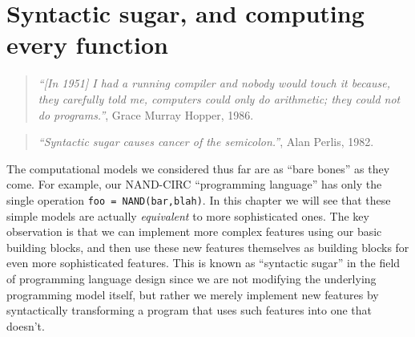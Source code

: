 \chapter{Syntactic sugar, and computing every
function}\label{finiteuniversalchap}


\begin{quote}
\emph{``{[}In 1951{]} I had a running compiler and nobody would touch it
because, they carefully told me, computers could only do arithmetic;
they could not do programs.''}, Grace Murray Hopper, 1986.
\end{quote}

\begin{quote}
\emph{``Syntactic sugar causes cancer of the semicolon.''}, Alan Perlis,
1982.
\end{quote}

The computational models we considered thus far are as ``bare bones'' as
they come. For example, our NAND-CIRC ``programming language'' has only
the single operation \texttt{foo = NAND(bar,blah)}. In this chapter we
will see that these simple models are actually \emph{equivalent} to more
sophisticated ones. The key observation is that we can implement more
complex features using our basic building blocks, and then use these new
features themselves as building blocks for even more sophisticated
features. This is known as ``syntactic sugar'' in the field of
programming language design since we are not modifying the underlying
programming model itself, but rather we merely implement new features by
syntactically transforming a program that uses such features into one
that doesn't.

